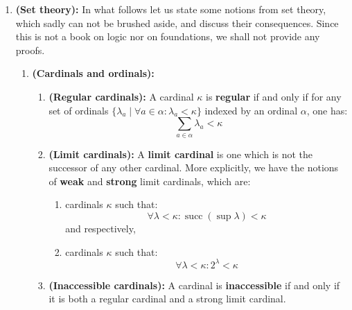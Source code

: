 \begin{enumerate}
\begin{enumerate}
\begin{enumerate}
                    \end{enumerate}
            \end{enumerate}
        \item \textbf{(Set theory):} In what follows let us state some notions from set theory, which sadly can not be brushed aside, and discuss their consequences. Since this is not a book on logic nor on foundations, we shall not provide any proofs.
            \begin{enumerate}
                \item \textbf{(Cardinals and ordinals):}
                    \begin{definition} \label{def: limit_cardinal}
                        \noindent
                        \begin{enumerate}
                            \item \textbf{(Regular cardinals):} A cardinal $\kappa$ is \textbf{regular} if and only if for any set of ordinals $\{\lambda_a \mid \forall a \in \alpha: \lambda_a < \kappa\}$ indexed by an ordinal $\alpha$, one has:
                            $$\sum_{a \in \alpha} \lambda_a < \kappa$$ 
                            \item \textbf{(Limit cardinals):} A \textbf{limit cardinal} is one which is not the successor of any other cardinal. More explicitly, we have the notions of \textbf{weak} and \textbf{strong} limit cardinals, which are:
                                \begin{enumerate}
                                    \item cardinals $\kappa$ such that:
                                        $$\forall \lambda < \kappa: \operatorname{succ} (\sup \lambda) < \kappa$$
                                    and respectively,
                                    \item cardinals $\kappa$ such that:
                                        $$\forall \lambda < \kappa: 2^{\lambda} < \kappa$$
                                \end{enumerate}
                            \item \textbf{(Inaccessible cardinals):} A cardinal is \textbf{inaccessible} if and only if it is both a regular cardinal and a strong limit cardinal.
                        \end{enumerate}
                    \end{definition}
                    \begin{example}

\end{example}
\end{enumerate}
\end{enumerate}
